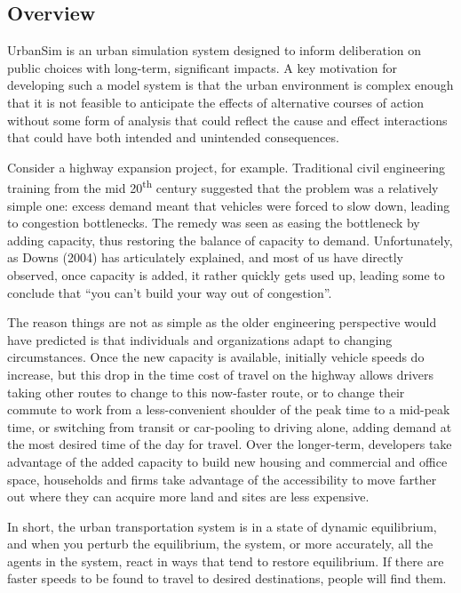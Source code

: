 \subsection{Overview}

UrbanSim is an urban simulation system designed to inform deliberation on public choices with long-term, significant impacts. A key motivation for developing such a model system is that the urban environment
is complex enough that it is not feasible to anticipate the effects of alternative courses of action without some form of analysis that could reflect the cause and effect interactions that could have both intended and unintended consequences.

Consider a highway expansion project, for example. Traditional civil engineering training from the mid 20\textsuperscript{th} century suggested that the problem was a relatively simple one: excess demand meant that vehicles were forced to slow down, leading to congestion bottlenecks. The remedy was seen as easing the bottleneck by adding capacity, thus restoring the balance of capacity to demand. Unfortunately, as Downs (2004) has articulately explained, and most of us have directly observed, once capacity is added, it rather quickly gets used up, leading some to conclude that \enquote{you can't build your way out of congestion}.

The reason things are not as simple as the older engineering perspective would have predicted is that individuals and organizations adapt to changing circumstances. Once the new capacity is available, initially vehicle speeds do increase, but this drop in the time cost of travel on the highway allows drivers taking other routes to change to this now-faster route, or to change their commute to work from a less-convenient shoulder of the peak time to a mid-peak time, or switching from transit or car-pooling to driving alone, adding demand at the most desired time of the day for travel. Over the longer-term, developers take advantage of the added capacity to build new housing and commercial and office space, households and firms take advantage of the accessibility to move farther out where they can acquire more land and sites are less expensive.

In short, the urban transportation system is in a state of dynamic equilibrium, and when you perturb the equilibrium, the system, or more accurately, all the agents in the system, react in ways that tend to restore equilibrium. If there are faster speeds to be found to travel to desired destinations, people will find them.


